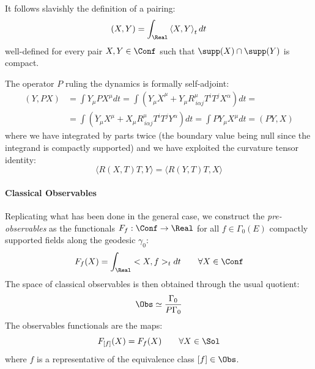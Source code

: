 \documentclass[Main]{subfiles}
\begin{document}
				It follows slavishly the definition of a pairing:
				\begin{equation}
					\left( X, Y \right) = \int_\Real \left\langle X,Y \right\rangle_t dt
				\end{equation}
				well-defined for every pair $X,Y \in \Conf$ such that $\supp(X) \cap \supp(Y)$ is compact.
				
				The operator $P$ ruling the dynamics is formally self-adjoint:
				\begin{align*}
				 ( Y, PX) &= \int Y_\mu PX^\mu dt= 
				 \int\left( Y_\mu \ddot{X}^\mu + Y_\mu R^\mu_{\, i \alpha j}T^i T^j X^\alpha \right)dt = \\
 				 &= \int\left( \ddot{Y}_\mu X^\mu + X_\mu R^\mu_{\, i \alpha j}T^i T^j Y^\alpha \right)dt =
				 \int P Y_\mu X^\mu dt=( PY, X) 				 				 
				\end{align*}
				where we have integrated by parts twice (the boundary value being null since the integrand is compactly supported) and we have exploited the curvature tensor identity:
				\begin{equation}\label{Eq:CurvatureSimmetry}
					\langle R(X,T)T,Y \rangle = \langle R(Y,T)T,X \rangle
				\end{equation}

			\paragraph{Classical Observables}
				Replicating what has been done in the general case, 
				we construct the \emph{pre-observables} as the functionals $F_f:\Conf \rightarrow \Real$ for all $f \in \Gamma_0(E)$ compactly supported fields along the geodesic $\gamma_0$:
				\begin{equation}
					F_f(X) = \int_\Real <X, f>_t dt \qquad \forall X \in \Conf
				\end{equation}
				The space of classical observables is then obtained through the usual quotient:
				\begin{displaymath}
					\Obs \simeq \frac{\Gamma_0}{P \Gamma_0}
				\end{displaymath}
				The observables functionals are the maps:
				\begin{displaymath}
				 F_{[f]}(X) = F_f (X) \qquad \forall X \in \Sol
				\end{displaymath}
				where $f$ is a representative of the equivalence class $[f]\in \Obs$.
			
\end{document}

